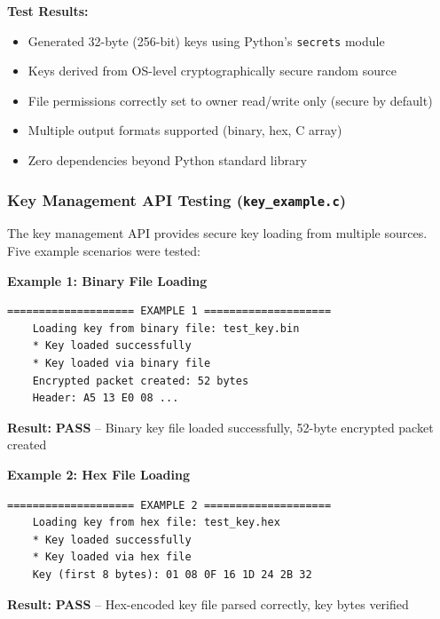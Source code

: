 \documentclass[11pt,a4paper]{article}
\begin{document}
\textbf{Test Results:}
\begin{itemize}[noitemsep]
	\item[\textcolor{codegreen}{\textbf{PASS}}] Generated 32-byte (256-bit) keys using Python's \texttt{secrets} module
	\item[\textcolor{codegreen}{\textbf{PASS}}] Keys derived from OS-level cryptographically secure random source
	\item[\textcolor{codegreen}{\textbf{PASS}}] File permissions correctly set to owner read/write only (secure by default)
	\item[\textcolor{codegreen}{\textbf{PASS}}] Multiple output formats supported (binary, hex, C array)
	\item[\textcolor{codegreen}{\textbf{PASS}}] Zero dependencies beyond Python standard library
\end{itemize}

\subsubsection{Key Management API Testing (\texttt{key\_example.c})}

The key management API provides secure key loading from multiple sources. Five example scenarios were tested:

\textbf{Example 1: Binary File Loading}
\begin{lstlisting}[basicstyle=\ttfamily\footnotesize]
	==================== EXAMPLE 1 ====================
	Loading key from binary file: test_key.bin
	* Key loaded successfully
	* Key loaded via binary file
	Encrypted packet created: 52 bytes
	Header: A5 13 E0 08 ...
\end{lstlisting}
\textbf{Result:} \textcolor{codegreen}{\textbf{PASS}} -- Binary key file loaded successfully, 52-byte encrypted packet created

\vspace{0.3cm}

\textbf{Example 2: Hex File Loading}
\begin{lstlisting}[basicstyle=\ttfamily\footnotesize]
	==================== EXAMPLE 2 ====================
	Loading key from hex file: test_key.hex
	* Key loaded successfully
	* Key loaded via hex file
	Key (first 8 bytes): 01 08 0F 16 1D 24 2B 32
\end{lstlisting}
\textbf{Result:} \textcolor{codegreen}{\textbf{PASS}} -- Hex-encoded key file parsed correctly, key bytes verified

\vspace{0.3cm}
\end{document}
